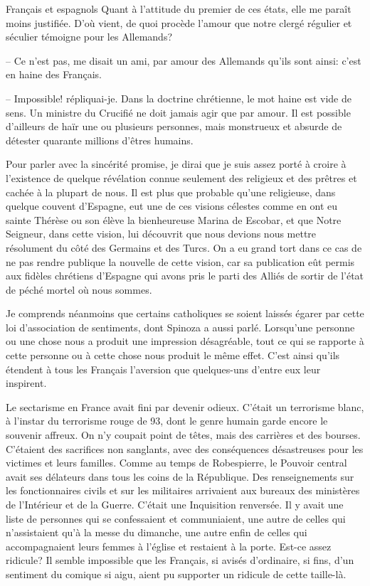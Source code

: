 \begin{chapter}{Français et espagnols}
Quant à l'attitude du premier de ces états, elle me paraît moins
justifiée. D'où vient, de quoi procède l'amour que notre clergé régulier
et séculier témoigne pour les Allemands?

-- Ce n'est pas, me disait un ami, par amour des Allemands qu'ils sont
ainsi: c'est en haine des Français.

-- Impossible! répliquai-je. Dans la doctrine chrétienne, le mot haine
est vide de sens. Un ministre du Crucifié ne doit jamais agir que par
amour. Il est possible d'ailleurs de haïr une ou plusieurs personnes,
mais monstrueux et absurde de détester quarante millions d'êtres
humains.

Pour parler avec la sincérité promise, je dirai que je suis assez porté
à croire à l'existence de quelque révélation connue seulement des
religieux et des prêtres et cachée à la plupart de nous. Il est plus que
probable qu'une religieuse, dans quelque couvent d'Espagne, eut une de
ces visions célestes comme en ont eu sainte Thérèse ou son élève la
bienheureuse Marina de Escobar, et que Notre Seigneur, dans cette
vision, lui découvrit que nous devions nous mettre résolument du côté
des Germains et des Turcs. On a eu grand tort dans ce cas de ne pas
rendre publique la nouvelle de cette vision, car sa publication eût
permis aux fidèles chrétiens d'Espagne qui avons pris le parti des
Alliés de sortir de l'état de péché mortel où nous sommes.

Je comprends néanmoins que certains catholiques se soient laissés égarer
par cette loi d'association de sentiments, dont Spinoza a aussi parlé.
Lorsqu'une personne ou une chose nous a produit une impression
désagréable, tout ce qui se rapporte à cette personne ou à cette chose
nous produit le même effet. C'est ainsi qu'ils étendent à tous les
Français l'aversion que quelques-uns d'entre eux leur inspirent.

Le sectarisme en France avait fini par devenir odieux. C'était un
terrorisme blanc, à l'instar du terrorisme rouge de 93, dont le genre
humain garde encore le souvenir affreux. On n'y coupait point de têtes,
mais des carrières et des bourses. C'étaient des sacrifices non
sanglants, avec des conséquences désastreuses pour les victimes et leurs
familles. Comme au temps de Robespierre, le Pouvoir central avait ses
délateurs dans tous les coins de la République. Des renseignements sur
les fonctionnaires civils et sur les militaires arrivaient aux bureaux
des ministères de l'Intérieur et de la Guerre. C'était une Inquisition
renversée. Il y avait une liste de personnes qui se confessaient et
communiaient, une autre de celles qui n'assistaient qu'à la messe du
dimanche, une autre enfin de celles qui accompagnaient leurs femmes à
l'église et restaient à la porte. Est-ce assez ridicule? Il semble
impossible que les Français, si avisés d'ordinaire, si fins, d'un
sentiment du comique si aigu, aient pu supporter un ridicule de cette
taille-là.


\end{chapter}
